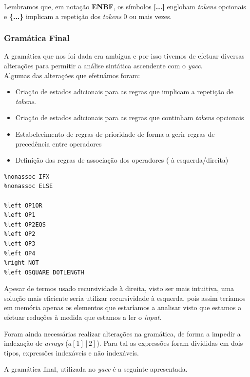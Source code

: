 \documentclass[12pt]{article}
\begin{document}
\vspace{0.5cm}

Lembramos que, em notação \textbf{ENBF}, os símbolos \textbf{[...]} englobam \emph{tokens} opcionais e \textbf{\{...\}} implicam a repetição dos \emph{tokens} 0 ou mais vezes.


\pagebreak
\subsubsection{Gramática Final}
\par A gramática que nos foi dada era ambígua e por isso tivemos de efetuar diversas alterações para permitir a análise sintática ascendente com o \emph{yacc}.\\
Algumas das alterações que efetuámos foram:
\begin{itemize}
	\item Criação de estados adicionais para as regras que implicam a repetição de \emph{tokens}.
	\item Criação de estados adicionais para as regras que continham \emph{tokens} opcionais
	\item Estabelecimento de regras de prioridade de forma a gerir regras de precedência entre operadores
	\item Definição das regras de associação dos operadores ( à esquerda/direita)
\end{itemize}

\lstset{language=c,caption=Associação de Operadores,label=Estruturas2}
\begin{lstlisting}
%nonassoc IFX
%nonassoc ELSE

%left OP1OR
%left OP1
%left OP2EQS
%left OP2
%left OP3
%left OP4
%right NOT
%left OSQUARE DOTLENGTH
\end{lstlisting}  


Apesar de termos usado recursividade  à direita, visto ser mais intuitiva, uma solução mais eficiente seria utilizar recursividade à esquerda, pois assim teríamos em memória apenas os elementos que estaríamos a analisar visto que estamos a efetuar reduções à medida que estamos a ler o \emph{input}.
\par Foram ainda necessárias realizar alterações na gramática, de forma a impedir a indexação de \emph{arrays} ($a[1][2]$). Para tal as expressões foram divididas em dois tipos, expressões indexáveis e não indexáveis.

\pagebreak
A gramática final, utilizada no \emph{yacc} é a seguinte apresentada.
\end{document}
